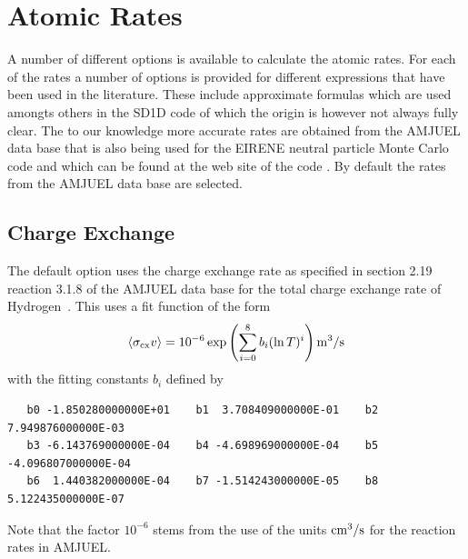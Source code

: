 \documentclass[amsmath,amssymb,a4]{revtex4-2}
\begin{document}




\section{Atomic Rates}\label{rates}

A number of different options is available to calculate the atomic rates. For each of the rates a number of options is provided for different expressions that have been used in the literature. These include approximate formulas which are used amongts others in the SD1D code \cite{SD1D} of which the origin is however not always fully clear. The to our knowledge more accurate rates are obtained from the AMJUEL data base that is also being used for the EIRENE neutral particle Monte Carlo code and which can be found at the web site of the code \cite{EIRENE}. By default the rates from the AMJUEL data base are selected.


\subsection{Charge Exchange}

The default option uses the charge exchange rate as specified in section 2.19 reaction 3.1.8 of the AMJUEL data base for the total charge exchange rate of Hydrogen~\cite{EIRENE}. This uses a fit function of the form
\begin{equation}\label{charge_exchange_AMJUEL}
    \langle\sigma_{\rm cx} v\rangle = 10^{-6} \exp\left( \sum_{i=0}^8 b_i (\ln T)^i \right)  {\rm m}^3/{\rm s}
\end{equation}
with the fitting constants $b_i$ defined by
\begin{small}\begin{verbatim}
   b0 -1.850280000000E+01    b1  3.708409000000E-01    b2  7.949876000000E-03
   b3 -6.143769000000E-04    b4 -4.698969000000E-04    b5 -4.096807000000E-04
   b6  1.440382000000E-04    b7 -1.514243000000E-05    b8  5.122435000000E-07
\end{verbatim}\end{small}
Note that the factor $10^{-6}$ stems from the use of the units ${\rm cm}^3/{\rm s}$ for the reaction rates in AMJUEL.
\end{document}
